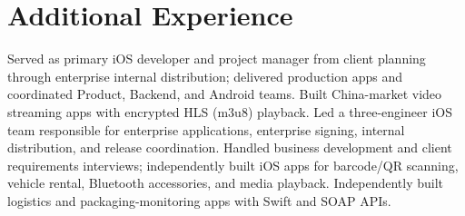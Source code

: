 \section{Additional Experience}

  {Served as primary iOS developer and project manager from client planning through enterprise internal distribution; delivered production apps and coordinated Product, Backend, and Android teams.}
  {Built China-market video streaming apps with encrypted HLS (m3u8) playback.}
  {Led a three-engineer iOS team responsible for enterprise applications, enterprise signing, internal distribution, and release coordination.}
  {Handled business development and client requirements interviews; independently built iOS apps for barcode/QR scanning, vehicle rental, Bluetooth accessories, and media playback.}
  {Independently built logistics and packaging-monitoring apps with Swift and SOAP APIs.}
